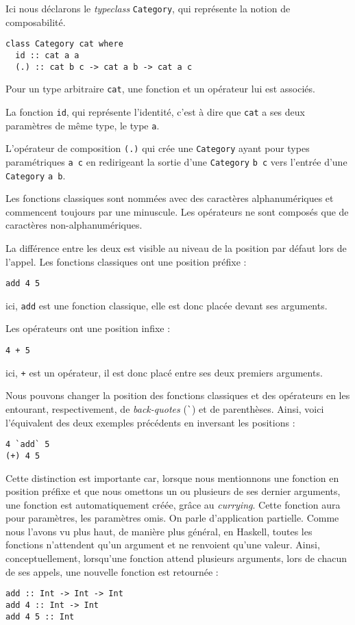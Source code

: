\documentclass{llncs}
\begin{document}
Ici nous déclarons le \emph{typeclass} \lstinline{Category}, qui représente
la notion de composabilité.
\begin{lstlisting}
class Category cat where
  id :: cat a a
  (.) :: cat b c -> cat a b -> cat a c
\end{lstlisting}

Pour un type arbitraire \lstinline{cat}, une fonction et un opérateur lui est
associés.

La fonction \lstinline{id}, qui représente l'identité, c'est à dire
que \lstinline{cat} a ses deux paramètres de même type, le type \lstinline{a}.

L'opérateur de composition \lstinline{(.)} qui crée une \lstinline{Category}
ayant pour types paramétriques \lstinline{a c} en redirigeant la sortie d'une
\lstinline{Category} \lstinline{b c} vers l'entrée d'une \lstinline{Category} \lstinline{a b}.

Les fonctions classiques sont nommées avec des caractères alphanumériques et commencent
toujours par une minuscule.
Les opérateurs ne sont composés que de caractères non-alphanumériques.

La différence entre les deux est visible au niveau de la position par défaut lors
de l'appel.
Les fonctions classiques ont une position préfixe :
\begin{lstlisting}
add 4 5
\end{lstlisting}

ici, \lstinline{add} est une fonction classique, elle est donc placée devant ses
arguments.

Les opérateurs ont une position infixe :
\begin{lstlisting}
4 + 5
\end{lstlisting}

ici, \lstinline{+} est un opérateur, il est donc placé entre ses deux premiers
arguments.

Nous pouvons changer la position des fonctions classiques et des opérateurs en
les entourant, respectivement, de \emph{back-quotes} (\lstinline{`}) et de parenthèses.
Ainsi, voici l'équivalent des deux exemples précédents en inversant les positions :
\begin{lstlisting}
4 `add` 5
(+) 4 5
\end{lstlisting}

Cette distinction est importante car, lorsque nous mentionnons une fonction en position
préfixe et que nous omettons un ou plusieurs de ses dernier arguments, une fonction
est automatiquement créée, grâce au \emph{currying}.
Cette fonction aura pour paramètres, les paramètres omis.
On parle d'application partielle.
Comme nous l'avons vu plus haut, de manière plus général, en Haskell, toutes les
fonctions n'attendent qu'un argument et ne renvoient qu'une valeur.
Ainsi, conceptuellement, lorsqu'une fonction attend plusieurs arguments, lors de
chacun de ses appels, une nouvelle fonction est retournée :
\begin{lstlisting}
add :: Int -> Int -> Int
add 4 :: Int -> Int
add 4 5 :: Int
\end{lstlisting}
\end{document}
